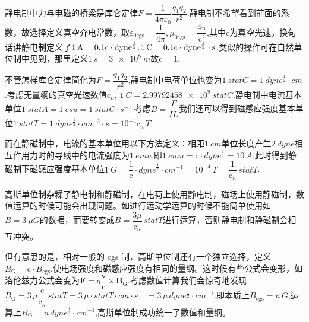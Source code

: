 \documentclass[../天体物理基础.tex]{subfiles}
\begin{document}
静电制中力与电磁的桥梁是库仑定律$F=\dfrac{1}{4\pi\varepsilon_{0}}\dfrac{q_{1}q_{2}}{r^{2}}$.静电制不希望看到前面的系数，故选择定义真空介电常数，取$\varepsilon_{0\text{cgs}}=\dfrac{1}{4\pi},\mu_{0\text{cgs}}=\dfrac{4\pi}{\mathrm{c}^{2}}$,其中$\mathrm{c}$为真空光速。换句话讲静电制定义了$\qty{1}{A}=0.1\mathrm{c}\cdot\unit{dyne}^{\frac12},\qty{1}{C}=0.1\mathrm{c}\cdot\rm{dyne}^{\frac12}\cdot s$.类似的操作可在自然单位制中见到，那里定义$\qty{1}{s}=\qty{3e8}{m}$故$\mathrm{c}=1$.

不管怎样库仑定律简化为$F=\dfrac{q_{1}q_{2}}{r^{2}}$,静电制中电荷单位也变为$\qty{1}{statC}=\qty{1}{dyne^{\frac{1}{2}}\cdot cm}$.考虑无量纲的真空光速数值$\mathrm{c}_{n}$, $\qty{1}{C}=\qty{2.99792458e9}{statC}$.静电制中电流基本单位$\qty{1}{statA}=\qty{1}{esu}=\qty{1}{statC\cdot{}s^{-1}}$.考虑$B=\dfrac{F}{IL}$我们还可以得到磁感应强度基本单位$\qty{1}{statT}=\qty{1}{dyne^{\frac{1}{2}}\cdot cm^{-2}\cdot s}=10^{-4}\mathrm{c}_{n}\,\unit{T}$.

而在静磁制中，电流的基本单位用以下方法定义：相距$\qty{1}{cm}$单位长度产生$\qty{2}{dyne}$相互作用力时的导线中的电流强度为$\qty{1}{emu}$.即$\qty{1}{emu}=\mathrm{c}\cdot\unit{dyne^{\frac{1}{2}}}=\qty{10}{A}$.此时得到静磁制下磁感应强度基本单位$\qty{1}{G}=\dfrac{1}{\mathrm{c}}\cdot\unit{dyne}^{\frac{1}{2}}\cdot\unit{cm}^{-1}=10^{-4}\,\unit{T}=\dfrac1{\mathrm{c}_{n}}\,\unit{statT}$.

高斯单位制杂糅了静电制和静磁制，在电荷上使用静电制，磁场上使用静磁制，数值运算的时候可能会出现问题。如进行运动学运算的时候不能简单使用如$B=\qty{3}{\mu G}$的数据，而要转变成$B=\dfrac{3\mu}{\mathrm{c}_{n}}\,\unit{statT}$进行运算，否则静电制和静磁制会相互冲突。

但有意思的是，相对一般的 cgs 制，高斯单位制还有一个独立选择，定义$B_{\text{G}}=\mathrm{c}\cdot B_{\text{cgs}}$,使电场强度和磁感应强度有相同的量纲。这时候有些公式会变形，如洛伦兹力公式会变为$\boldsymbol{F}=q\dfrac{\boldsymbol{v}}{\mathrm{c}}\times\boldsymbol{B}_{\text{G}}$.考虑数值计算我们会惊奇地发现$B_{\text{G}}=3\,\mu\dfrac{\mathrm{c}}{\mathrm{c}_{n}}\,\unit{statT}=3\,\mu\cdot\unit{statT}\cdot\unit{cm\cdot{}s^{-1}}=3\,\mu\,\unit{dyne^{\frac{1}{2}}}\cdot\unit{cm}^{-1}$.即本质上$B_{\text{cgs}}=n\,\unit{G}$,运算上$B_{\text{G}}=n\,\unit{dyne^{\frac{1}{2}}\cdot cm^{-1}}$,高斯单位制成功统一了数值和量纲。
\end{document}
